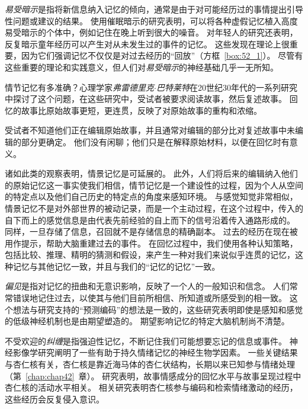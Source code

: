 \textit{易受暗示}是指将新信息纳入记忆的倾向，通常是由于对可能经历过的事情提出引导性问题或建议的结果。
使用催眠暗示的研究表明，可以将各种虚假记忆植入高度易受暗示的个体中，例如记住在晚上听到很大的噪音。
对年轻人的研究还表明，反复暗示童年经历可以产生对从未发生过的事件的记忆。
这些发现在理论上很重要，因为它们强调记忆不仅仅是对过去经历的“回放”（方框~\ref{box:52_1}）。
尽管有这些重要的理论和实践意义，但人们对\textit{易受暗示}的神经基础几乎一无所知。


\begin{proposition}[情节记忆在回忆过程中会发生变化] \label{box:52_1}
	
	\quad \quad 情节记忆有多准确？心理学家\textit{弗雷德里克$\cdot$巴特莱特}在20世纪30年代的一系列研究中探讨了这个问题，在这些研究中，受试者被要求阅读故事，然后复述故事。
	回忆的故事比原始故事更短，更连贯，反映了对原始故事的重构和浓缩。
	
	\quad \quad 受试者不知道他们正在编辑原始故事，并且通常对编辑的部分比对复述故事中未编辑的部分更确定。
	他们没有闲聊；他们只是在解释原始材料，以便在回忆时有意义。
	
	\quad \quad 诸如此类的观察表明，情景记忆是可延展的。
	此外，人们将后来的编辑纳入他们的原始记忆这一事实使我们相信，情节记忆是一个建设性的过程，因为个人从空间的特定点以及他们自己历史的特定点的角度来感知环境。
	与感觉知觉非常相似，情景记忆不是对外部世界的被动记录，而是一个主动过程，在这个过程中，传入的自下而上的感觉信息是由代表先前经验的自上而下的信号沿着传入通路形成的。
	同样，一旦存储了信息，召回就不是存储信息的精确副本。
	过去的经历在现在被用作提示，帮助大脑重建过去的事件。
	在回忆过程中，我们使用各种认知策略，包括比较、推理、精明的猜测和假设，来产生一种对我们来说似乎连贯的记忆，这种记忆与其他记忆一致，并且与我们的“记忆的记忆”一致。
	
\end{proposition}


\textit{偏见}是指对记忆的扭曲和无意识影响，反映了一个人的一般知识和信念。
人们常常错误地记住过去，以使其与他们目前所相信、所知道或所感受到的相一致。
这个想法与研究支持的“预测编码”的想法是一致的，这些研究表明即使是感知和感觉的低级神经机制也是由期望塑造的。
期望影响记忆的特定大脑机制尚不清楚。


不受欢迎的\textit{纠缠}是指强迫性记忆，不断记住我们可能想要忘记的信息或事件。
神经影像学研究阐明了一些有助于持久情绪记忆的神经生物学因素。
一些关键结果与杏仁核有关，杏仁核是靠近海马体的杏仁状结构，长期以来已知参与情绪处理（第~\ref{chap:chap42}~章）。
研究表明，故事情感成分的回忆水平与故事呈现过程中杏仁核的活动水平相关。
相关研究表明杏仁核参与编码和检索情绪激动的经历，这些经历会反复侵入意识。


